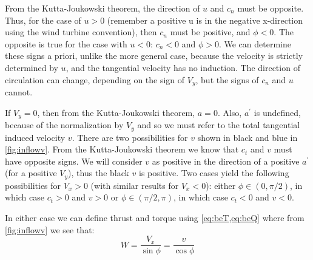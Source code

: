 \documentclass{article}
\begin{document}
From the Kutta-Joukowski theorem, the direction of $u$ and $c_n$ must be opposite.  Thus, for the case of $u > 0$ (remember a positive u is in the negative x-direction using the wind turbine convention), then $c_n$ must be positive, and $\phi < 0$.  The opposite is true for the case with $u < 0$: $c_n < 0$ and $\phi > 0$.  We can determine these signs a priori, unlike the more general case, because the velocity is strictly determined by $u$, and the tangential velocity has no induction.  The direction of circulation can change, depending on the sign of $V_y$, but the signs of $c_n$ and $u$ cannot.




If $V_y = 0$, then from the Kutta-Joukowski theorem, $a = 0$.  Also, $a^\prime$ is undefined, because of the normalization by $V_y$ and so we must refer to the total tangential induced velocity $v$.  There are two possibilities for $v$ shown in black and blue in \cref{fig:inflowv}.  From the Kutta-Joukowski theorem we know that $c_t$ and $v$ must have opposite signs.  We will consider $v$ as positive in the direction of a positive $a^\prime$ (for a positive $V_y$), thus the black $v$ is positive.  Two cases yield the following possibilities for $V_x > 0$ (with similar results for $V_x < 0$): either $\phi \in (0, \pi/2)$, in which case $c_t > 0$ and $v > 0$ or $\phi \in (\pi/2, \pi)$, in which case $c_t < 0$ and $v < 0$.

In either case we can define thrust and torque using \cref{eq:beT,eq:beQ} where from \cref{fig:inflowv} we see that:
\begin{equation}
    W = \frac{V_x}{\sin\phi} = \frac{v}{\cos\phi}
\end{equation}
\end{document}
